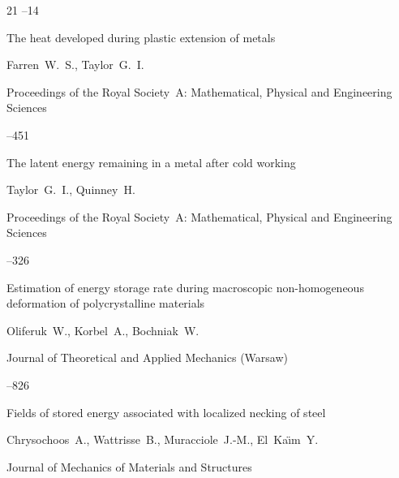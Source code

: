 \begin{thebibliography}{21}
--14




\paper The heat developed during plastic extension of metals

\by Farren~W.~S., Taylor~G.~I.

\jour Proceedings of the Royal Society~A: Mathematical, Physical and Engineering Sciences




--451





\paper The latent energy remaining in a metal after cold working

\by  Taylor~G.~I., Quinney~H.

\jour Proceedings of the Royal Society~A: Mathematical, Physical and Engineering Sciences




--326





\paper Estimation of energy storage rate during macroscopic non-homogeneous deformation of polycrystalline materials

\by  Oliferuk~W., Korbel~A., Bochniak~W.

\jour Journal of Theoretical and Applied Mechanics (Warsaw)




--826




\paper  Fields of stored energy associated with localized necking of steel 

\by  Chrysochoos~A., Wattrisse~B., Muracciole~J.-M., El~Ka{\"\i}m~Y.

\jour Journal of Mechanics of Materials and Structures



\end{thebibliography}
